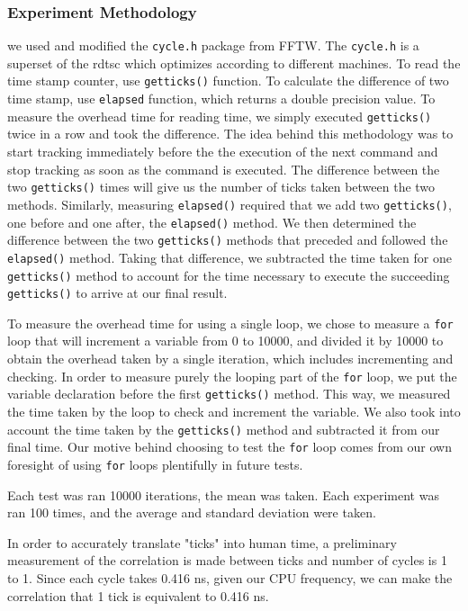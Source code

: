 \documentclass{article} %
\begin{document}
\subsubsection{Experiment Methodology}
we used and modified the \texttt{cycle.h} package from FFTW\cite{FFTW}.  The
\texttt{cycle.h} is a superset of the rdtsc which optimizes according to
different machines.  To read the time stamp counter, use \texttt{getticks()}
function. To calculate the difference of two time stamp, use \texttt{elapsed}
function, which returns a double precision value.  To measure the overhead
time for reading time, we simply executed \texttt{getticks()} twice in a row
and took the difference. The idea behind this methodology was to start
tracking immediately before the the execution of the next command and stop
tracking as soon as the command is executed. The difference between the two
\texttt{getticks()} times will give us the number of ticks taken between the
two methods. Similarly, measuring \texttt{elapsed()} required that we add two
\texttt{getticks()}, one before and one after, the \texttt{elapsed()} method.
We then determined the difference between the two \texttt{getticks()} methods
that preceded and followed the \texttt{elapsed()} method. Taking that
difference, we subtracted the time taken for one \texttt{getticks()} method to
account for the time necessary to execute the succeeding \texttt{getticks()}
to arrive at our final result.

To measure the overhead time for using a single loop, we chose to measure
a \texttt{for} loop that will increment a variable from 0 to 10000, and
divided it by 10000 to obtain the overhead taken by a single iteration, which
includes incrementing and checking. In order to measure purely the looping
part of the \texttt{for} loop, we put the variable declaration before the
first \texttt{getticks()} method. This way, we measured the time taken by the
loop to check and increment the variable. We also took into account the time
taken by the \texttt{getticks()} method and subtracted it from our final time.
Our motive behind choosing to test the \texttt{for} loop comes from our own foresight
of using \texttt{for} loops plentifully in future tests.

Each test was ran 10000 iterations, the mean was taken.  Each experiment was
ran 100 times, and the average and standard deviation were taken.

In order to accurately translate "ticks" into human time, a preliminary
measurement of the correlation is made between ticks and number of cycles is
1 to 1.  Since each cycle takes 0.416 ns, given our CPU frequency, we can make
the correlation that 1 tick is equivalent to 0.416 ns.
\end{document}
